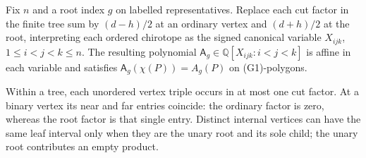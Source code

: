 \begin{lemma}\label{lem:multiaffine}
Fix $n$ and a root index $g$ on labelled representatives. Replace
each cut factor in the finite tree sum by $(d-h)/2$ at an ordinary
vertex and $(d+h)/2$ at the root, interpreting each ordered
chirotope as the signed canonical variable $X_{ijk}$,
$1\leq i<j<k\leq n$. The resulting polynomial
$\mathsf A_g\in\mathbb Q[X_{ijk}:i<j<k]$ is affine in each variable
and satisfies $\mathsf A_g(\chi(P))=A_g(P)$ on (G1)-polygons.

Within a tree, each unordered vertex triple occurs in at most
one cut factor. At a binary vertex its near and far entries
coincide: the ordinary factor is zero, whereas the root factor
is that single entry. Distinct internal vertices can have the
same leaf interval only when they are the unary root and its
sole child; the unary root contributes an empty product.
\end{lemma}
